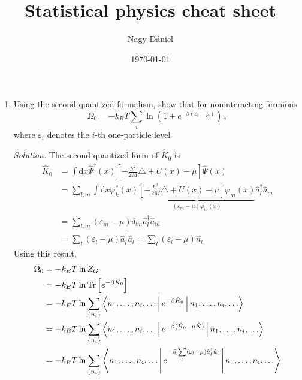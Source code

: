 \documentclass[11pt, a4paper]{article}
\title{Statistical physics cheat sheet}
\author{Nagy Dániel}
\date{\today}
\newcommand{\dd}{\mathrm{d}}
\newcommand{\Tr}[1]{\mathrm{Tr}\left[#1\right]}
\begin{document}
\maketitle
\newpage

\begin{enumerate}
    \item Using the second quantized formalism, show that for noninteracting fermions
    \begin{equation*}
        \Omega_0 = -k_BT\sum\limits_i \ln \left(1 + e^{-\beta(\varepsilon_i - \mu)}\right)\,,
    \end{equation*}
    where $\varepsilon_i$ denotes the $i$-th one-particle level
    \par\textit{Solution.}
    The second quantized form of $\hat K_0$ is 
    \begin{align*}
        \hat K_0 &= \int \dd x \hat\Psi^{\dagger}(x)\left[-\frac{\hbar^2}{2M}\triangle + U(x)
        -\mu\right]\hat\Psi(x) \\
        & = \sum\limits_{l,m} \int \dd x  \varphi_k^*(x)\underbrace{\left[-\frac{\hbar^2}{2M}\triangle + U(x)
        -\mu\right]\varphi_m(x)}_{(\varepsilon_m - \mu)\varphi_m(x)} \hat a_l^{\dagger}\hat a_m \\
        & = \sum\limits_{l,m}(\varepsilon_m - \mu)\delta_{lm} \hat a_l^{\dagger}\hat a_m \\
        & = \sum\limits_l (\varepsilon_l-\mu) \hat a_l^{\dagger}\hat a_l 
        = \sum\limits_l (\varepsilon_l-\mu) \hat n_l
    \end{align*}
    Using this result, 
    \begin{align*}
        \Omega_0 &= -k_BT\ln Z_G\\
        &= -k_BT \ln \Tr{e^{-\beta \hat K_0}}\\
        &= -k_BT \ln \sum\limits_{\{n_i\}}\Braket{n_1, \dots, n_i, \dots | e^{-\beta \hat K_0} |n_1, \dots, n_i, \dots }\\
        &= -k_BT \ln \sum\limits_{\{n_i\}}\Braket{n_1, \dots, n_i, \dots | e^{-\beta (\hat H_0-\mu \hat N)} |n_1, \dots, n_i, \dots }\\
        &= -k_BT \ln \sum\limits_{\{n_i\}}\Braket{n_1, \dots, n_i, \dots | e^{-\beta \sum\limits_l(\varepsilon_l-\mu) \hat a_l^{\dagger} \hat a_l}| n_1, \dots, n_i, \dots }\\

\end{align*}
\end{enumerate}
\end{document}
